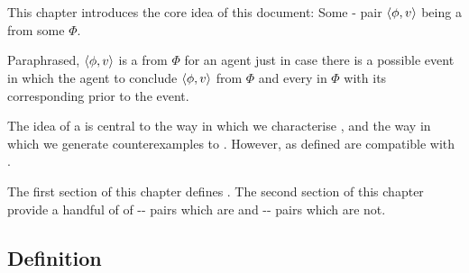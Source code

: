 \chapter{}
\label{cha:fcs}

\nocite{Ryle:1946tu}



\begin{note}
  This chapter introduces the core idea of this document:
  Some - pair \(\langle\phi, v\rangle\) being a \emph{\fc{}} from some  \(\Phi\).

  Paraphrased, \(\langle\phi, v\rangle\) is a \fc{} from \(\Phi\) for an agent just in case there is a possible event in which the agent to conclude \(\langle\phi, v\rangle\) from \(\Phi\) and \evals{} every \prop{} in \(\Phi\) with its corresponding \val{} prior to the event.
\end{note}

\begin{note}
  The idea of a  is central to the way in which we characterise , and the way in which we generate counterexamples to \issueInclusion{}.
  However,  as defined are compatible with \issueInclusion{}.
\end{note}

\begin{note}
  The first section of this chapter defines .
  The second section of this chapter provide a handful of  of -- pairs which are  and -- pairs which are not.
\end{note}

\section{Definition}
\label{cha:fcs:def}

